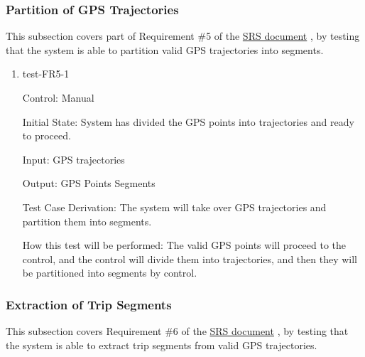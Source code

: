 \documentclass[12pt, titlepage]{article}
\begin{document}
\subsubsection{Partition of GPS Trajectories}

This subsection covers part of Requirement \#5 of the \href{https://github.com/paezha/PyERT-BLACK/blob/main/docs/SRS/SRS.pdf}{SRS document} \citep{SRS}, by testing that the system is able to partition valid GPS trajectories into segments.

\begin{enumerate}

\item{test-FR5-1\\} \label{test-FR5-1}

Control: Manual 
					
Initial State: System has divided the GPS points into trajectories and ready to proceed.
					
Input: GPS trajectories
					
Output: GPS Points Segments 

Test Case Derivation: The system will take over GPS trajectories and partition them into segments.
					
How this test will be performed: The valid GPS points will proceed to the control, and the control will divide them into trajectories, and then they will be partitioned into segments by control.

\end{enumerate}

\subsubsection{Extraction of Trip Segments}

This subsection covers Requirement \#6 of the \href{https://github.com/paezha/PyERT-BLACK/blob/main/docs/SRS/SRS.pdf}{SRS document} \citep{SRS}, by testing that the system is able to extract trip segments from valid GPS trajectories.
\end{document}
